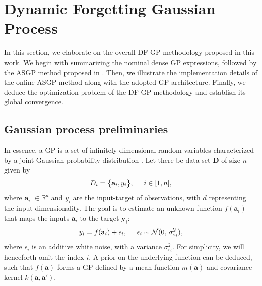 \section{Dynamic Forgetting Gaussian Process}
\label{sec:dfgp}
In this section, we elaborate on the overall \ac{DF-GP} methodology proposed in this work. We begin with summarizing the nominal dense \ac{GP} expressions, followed by the \ac{ASGP} method proposed in \cite{asgp}. Then, we illustrate the implementation details of the online \ac{ASGP} method along with the adopted GP architecture. Finally, we deduce the optimization problem of the \ac{DF-GP} methodology and establish its global convergence.


\subsection{Gaussian process preliminaries}
In essence, a \ac{GP} is a set of infinitely-dimensional random variables characterized by a joint Gaussian probability distribution \cite{williams2006gaussian}. 
Let there be  data set $\mathbf{D}$ of size $n$ given by
%
\begin{equation} \label{eq:data}
  D_i = \bigl\{\mathbf{a}_i, y_i\bigl\}, \hspace{0.5cm}   i \in [1, n],
\end{equation}
%
where $\mathbf{a}_i$  $\in \mathbb{R}^d$ and $y_i$ are the input-target of observations, with $d$ representing the input dimensionality. The goal is to estimate an unknown function $f(\mathbf{a}_i)$ that maps the inputs $\mathbf{a}_i$ to the target $\mathbf{y}_i$:
%
\begin{equation} \label{eq:data}
  y_i =f(\mathbf{a}_i)+\epsilon_i, \hspace{0.5cm}    \epsilon_i \sim \mathcal{N}(0,\,\sigma_{\varepsilon_{i}}^{2}),
\end{equation}
where $\epsilon_i$ is an additive white noise, with a variance $\sigma_{\varepsilon_{i}}^{2}$. For simplicity, we will henceforth omit the index $i$. A prior on the underlying function can be deduced, such that $f(\mathbf{a})$ forms a \ac{GP} defined by a mean function $m(\mathbf{a})$ and covariance kernel $k(\mathbf{a},\mathbf{a}')$.



